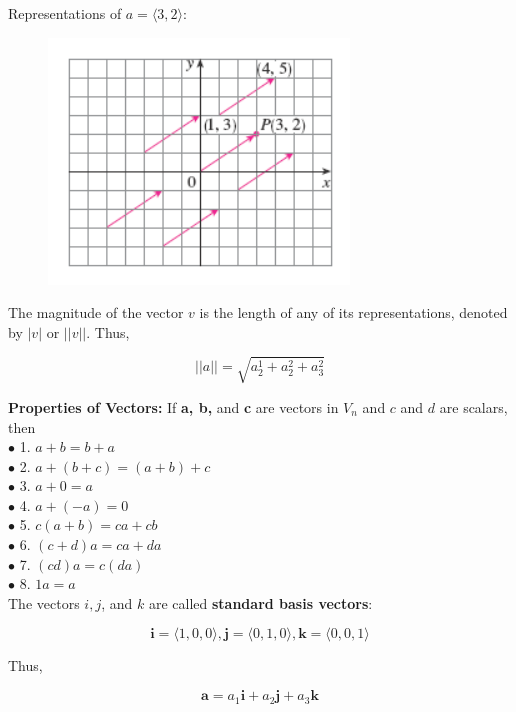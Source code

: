         Representations of $a = \langle 3,2\rangle$:

        \begin{figure}[hbt!]
            \centering
            \includegraphics[scale = 0.75]{Resources/12.2_Representations}
        \end{figure}

        The magnitude of the vector $v$ is the length of any of its representations, denoted by $|v|$ or $\lvert|v|\rvert$. Thus,

        \[
            \lvert|a|\rvert = \sqrt{a_2^1 + a_2^2 + a^2_3}
        \]

        \textbf{Properties of Vectors:} If \textbf{a, b,} and \textbf{c} are vectors in $V_n$ and $c$ and $d$ are scalars, then \\
        $\bullet$ 1. $a + b = b + a$ \\
        $\bullet$ 2. $a + (b + c) = (a + b) + c$ \\
        $\bullet$ 3. $a + 0 = a$ \\
        $\bullet$ 4. $a + (-a) = 0$ \\
        $\bullet$ 5. $c(a+b) = ca + cb$ \\
        $\bullet$ 6. $(c+d)a = ca + da$ \\
        $\bullet$ 7. $(cd)a = c(da)$ \\
        $\bullet$ 8. $1a = a$ \\

        The vectors $i, j$, and $k$ are called \textbf{standard basis vectors}:

        \[
            \mathbf{i} = \langle 1, 0, 0 \rangle, \mathbf{j} = \langle 0, 1, 0 \rangle, \mathbf{k} = \langle 0, 0, 1\rangle
        \]

        Thus,

        \[
            \mathbf{a} = a_1 \mathbf{i} + a_2 \mathbf{j} + a_3 \mathbf{k}
        \]

